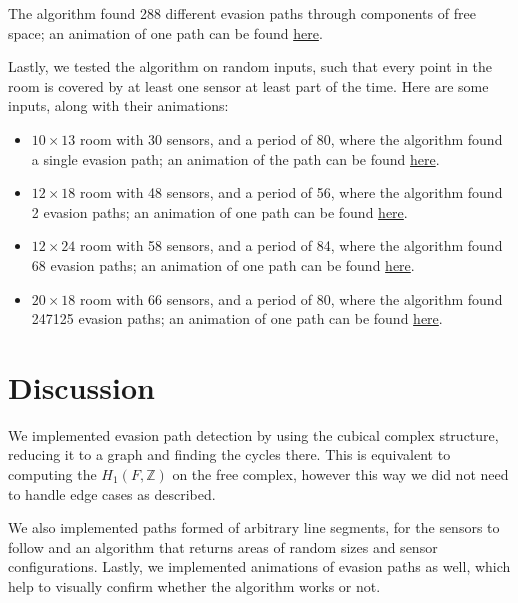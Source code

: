 \documentclass{article}
\begin{document}
The algorithm found 288 different evasion paths through components of free space; an animation of one path can be found \href{https://github.com/MOj0/TDA_Evasion/blob/main/report/example.gif}{here}.

\bigskip

Lastly, we tested the algorithm on random inputs, such that every point in the room is covered by at least one sensor at least part of the time.
Here are some inputs, along with their animations:

\begin{itemize}
  \item $10 \times 13$ room with 30 sensors, and a period of 80, where the algorithm found a single evasion path; an animation of the path can be found \href{https://github.com/MOj0/TDA_Evasion/blob/main/report/random_sensor_network_10x13_s30_p80_e1.gif}{here}.
  \item $12 \times 18$ room with 48 sensors, and a period of 56, where the algorithm found 2 evasion paths; an animation of one path can be found \href{https://github.com/MOj0/TDA_Evasion/blob/main/report/random_sensor_network_12x18_s48_p56_e2.gif}{here}.
  \item $12 \times 24$ room with 58 sensors, and a period of 84, where the algorithm found 68 evasion paths; an animation of one path can be found \href{https://github.com/MOj0/TDA_Evasion/blob/main/report/random_sensor_network_12x24_s58_p84_e68.gif}{here}.
  \item $20 \times 18$ room with 66 sensors, and a period of 80, where the algorithm found 247125 evasion paths; an animation of one path can be found \href{https://github.com/MOj0/TDA_Evasion/blob/main/report/random_sensor_network_20x18_s66_p80_e247125.gif}{here}.
\end{itemize}


\section{Discussion}

We implemented evasion path detection by using the cubical complex structure, reducing it to a graph and finding the cycles there.
This is equivalent to computing the $ H_1(F, \mathbb{Z})$ on the free complex, however this way we did not need to handle edge cases as described.

We also implemented paths formed of arbitrary line segments, for the sensors to follow and an algorithm that returns areas of random sizes and sensor configurations.
Lastly, we implemented animations of evasion paths as well, which help to visually confirm whether the algorithm works or not.
\end{document}
